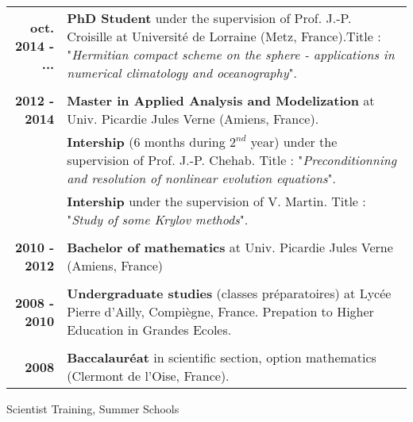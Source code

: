 \documentclass[10pt,a4paper]{report}
\begin{document}
\begin{center}
\begin{tabular}{r p{12cm}}
\textbf{oct. 2014 - ...} & \textbf{PhD Student} under the supervision of Prof. J.-P. Croisille at Université de Lorraine (Metz, France).\newline Title : "\textit{Hermitian compact scheme on the sphere - applications in numerical climatology and oceanography}".\\

& \\

\textbf{2012 - 2014} & \textbf{Master in Applied Analysis and Modelization} at Univ. Picardie Jules Verne (Amiens, France). \\

& \textbf{Intership} (6 months during $2^{nd}$ year) under the supervision of Prof. J.-P. Chehab. \newline 
Title : "\textit{Preconditionning and resolution of nonlinear evolution equations}". \\

& \textbf{Intership} under the supervision of V. Martin. \newline 
Title : "\textit{Study of some Krylov methods}". \\

& \\

\textbf{2010 - 2012} & \textbf{Bachelor of mathematics} at Univ. Picardie Jules Verne (Amiens, France) \\

& \\

\textbf{2008 - 2010} & \textbf{Undergraduate studies} (classes préparatoires) at Lycée Pierre d'Ailly, Compiègne, France.\newline
Prepation to Higher Education in Grandes Ecoles. \\

& \\

\textbf{2008} & \textbf{Baccalauréat} in scientific section, option mathematics (Clermont de l'Oise, France).\\
\end{tabular}
\end{center}

\vspace{.5cm}
\noindent
{\selectfont
\begin{Large}
Scientist Training, Summer Schools
\end{Large}
\hrulefill
}
\end{document}
